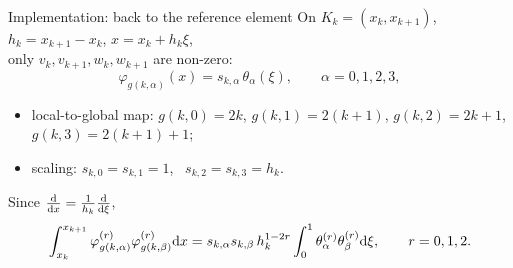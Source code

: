 \begin{frame}{Implementation: back to the reference element}
    On $K_k = (x_k, x_{k+1})$, $h_k = x_{k+1} - x_k$, $x = x_k + h_k \xi$,\\ only $v_k, v_{k+1}, w_k, w_{k+1}$ are non-zero:
    \[
        \varphi_{g(k,\alpha)}(x) = s_{k,\alpha}\, \theta_\alpha(\xi), \qquad \alpha = 0, 1, 2, 3,
    \]
    \begin{itemize}
        \item local-to-global map: $g(k,0) = 2k$, $g(k,1) = 2(k+1)$, $g(k,2) = 2k+1$, $g(k,3) = 2(k+1)+1$;
        \item scaling: $s_{k,0} = s_{k,1} = 1$, \ $s_{k,2} = s_{k,3} = h_k$.
    \end{itemize}
    Since $\frac{{\mathrm d}}{{\mathrm d} x} = \frac{1}{h_k}\frac{{\mathrm d}}{{\mathrm d} \xi}$,
    \[
        \int_{x_k}^{x_{k+1}} \varphi^{(r)}_{g(k,\alpha)} \varphi^{(r)}_{g(k,\beta)} {\mathrm d} x = s_{k,\alpha} s_{k,\beta}\, h_k^{1 - 2r} \int_0^1 \theta_\alpha^{(r)} \theta_\beta^{(r)} {\mathrm d}\xi, \qquad r = 0,1,2.
    \]
\end{frame}


